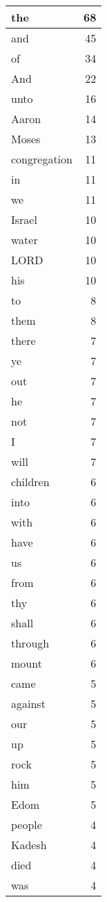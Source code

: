 \begin{center}
\begin{longtable}{l|r}
\hline \hline
\endlastfoot
the & 68 \\ \hline
and & 45 \\ \hline
of & 34 \\ \hline
And & 22 \\ \hline
unto & 16 \\ \hline
Aaron & 14 \\ \hline
Moses & 13 \\ \hline
congregation & 11 \\ \hline
in & 11 \\ \hline
we & 11 \\ \hline
Israel & 10 \\ \hline
water & 10 \\ \hline
LORD & 10 \\ \hline
his & 10 \\ \hline
to & 8 \\ \hline
them & 8 \\ \hline
there & 7 \\ \hline
ye & 7 \\ \hline
out & 7 \\ \hline
he & 7 \\ \hline
not & 7 \\ \hline
I & 7 \\ \hline
will & 7 \\ \hline
children & 6 \\ \hline
into & 6 \\ \hline
with & 6 \\ \hline
have & 6 \\ \hline
us & 6 \\ \hline
from & 6 \\ \hline
thy & 6 \\ \hline
shall & 6 \\ \hline
through & 6 \\ \hline
mount & 6 \\ \hline
came & 5 \\ \hline
against & 5 \\ \hline
our & 5 \\ \hline
up & 5 \\ \hline
rock & 5 \\ \hline
him & 5 \\ \hline
Edom & 5 \\ \hline
people & 4 \\ \hline
Kadesh & 4 \\ \hline
died & 4 \\ \hline
was & 4 \\ \hline

\end{longtable}
\end{center}
